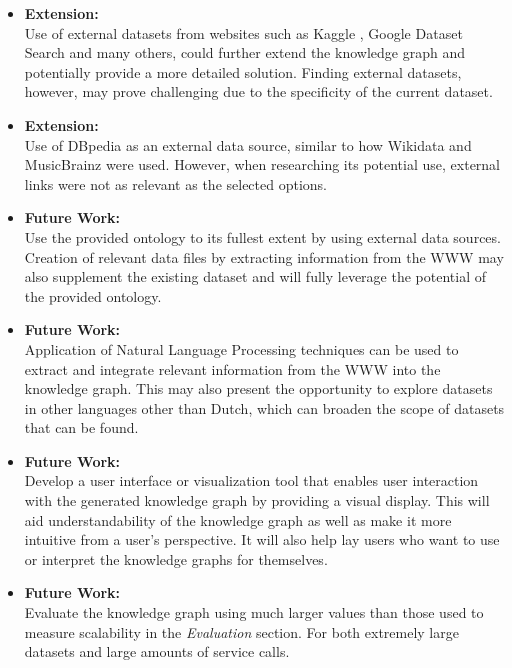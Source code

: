 \begin{itemize}
    \item \textbf{Extension:} \\ Use of external datasets from websites such as Kaggle \cite{kaggle}, Google Dataset Search \cite{googledatasetsearch} and many others, could further extend the knowledge graph and potentially provide a more detailed solution. Finding external datasets, however, may prove challenging due to the specificity of the current dataset.  
    \item \textbf{Extension:} \\ Use of DBpedia \cite{organdbpedia} as an external data source, similar to how Wikidata and MusicBrainz were used. However, when researching its potential use, external links were not as relevant as the selected options. 
    \item \textbf{Future Work:} \\ Use the provided ontology to its fullest extent by using external data sources. Creation of relevant data files by extracting information from the WWW may also supplement the existing dataset and will fully leverage the potential of the provided ontology. 
    \item \textbf{Future Work:} \\ Application of Natural Language Processing techniques can be used to extract and integrate relevant information from the WWW into the knowledge graph. This may also present the opportunity to explore datasets in other languages other than Dutch, which can broaden the scope of datasets that can be found. 
    \item \textbf{Future Work:} \\ Develop a user interface or visualization tool that enables user interaction with the generated knowledge graph by providing a visual display. This will aid understandability of the knowledge graph as well as make it more intuitive from a user's perspective. It will also help lay users who want to use or interpret the knowledge graphs for themselves. 
    \item \textbf{Future Work:} \\ Evaluate the knowledge graph using much larger values than those used to measure scalability in the \textit{Evaluation} section. For both extremely large datasets and large amounts of service calls. 
\end{itemize}

